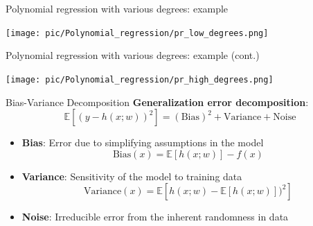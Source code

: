 \documentclass[serif, aspectratio=169]{beamer}
\begin{document}
    \begin{frame}{Polynomial regression with various degrees: example}
        \begin{minipage}{0.95\textwidth}
            \centering
            \texttt{[image: pic/Polynomial\_regression/pr\_low\_degrees.png]}
        \end{minipage}
        \vfill
    \end{frame}

    \begin{frame}{Polynomial regression with various degrees: example (cont.)}
        \begin{minipage}{0.95\textwidth}
            \centering
            \texttt{[image: pic/Polynomial\_regression/pr\_high\_degrees.png]}
        \end{minipage}
        \vfill
    \end{frame}


    \begin{frame}{Bias-Variance Decomposition}
        \textbf{Generalization error decomposition}:
        \[
            \mathbb{E}[(y - h(x;w))^2] = (\text{Bias})^2 + \text{Variance} + \text{Noise}
        \]
        \begin{itemize}
            \item \textbf{Bias}: Error due to simplifying assumptions in the model
            \[
                \text{Bias}(x) = \mathbb{E}[h(x;w)] - f(x)
            \]
            \item \textbf{Variance}: Sensitivity of the model to training data
            \[
                \text{Variance}(x) = \mathbb{E}[h(x;w) - \mathbb{E}[h(x;w)])^2]
            \]
            \item \textbf{Noise}: Irreducible error from the inherent randomness in data
        \end{itemize}
    \end{frame}
\end{document}

